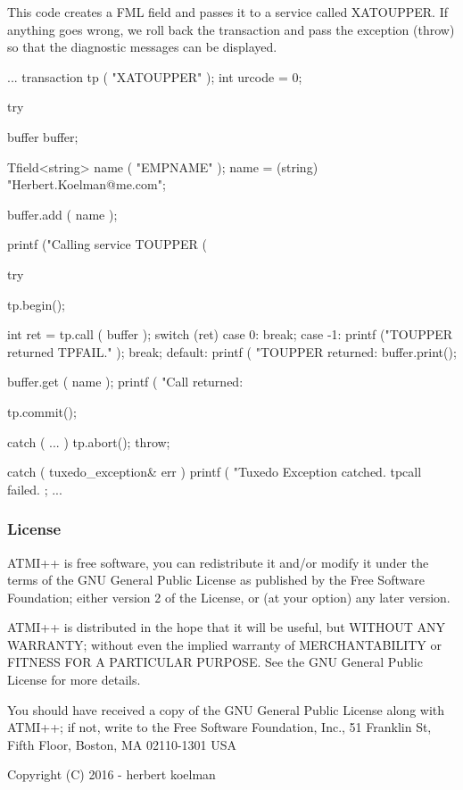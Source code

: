 This code creates a F\+M\+L field and passes it to a service called {\ttfamily X\+A\+T\+O\+U\+P\+P\+E\+R}. If anything goes wrong, we roll back the transaction and pass the exception ({\ttfamily throw}) so that the diagnostic messages can be displayed. \begin{DoxyVerb}    ...
    transaction tp ( "XATOUPPER" );
    int urcode = 0;

    try {

      buffer buffer;

      Tfield<string> name ( "EMPNAME" );
      name = (string) "Herbert.Koelman@me.com";

      buffer.add ( name );

      printf ("Calling service TOUPPER (%

      try {

        tp.begin();

        int ret = tp.call ( buffer );
        switch (ret) {
          case 0:
            break;
          case -1:
            printf ("TOUPPER returned TPFAIL.\n" );
            break;
          default:
            printf ( "TOUPPER returned: %
            buffer.print();
        }

        buffer.get ( name );
        printf ( "Call returned: %

        tp.commit();
      } catch ( ... ){
        tp.abort();
        throw;
      }

    } catch ( tuxedo_exception& err ) {
      printf ( "Tuxedo Exception catched. tpcall failed. %
    };
    ...
\end{DoxyVerb}


\subsubsection*{License}





A\+T\+M\+I++ is free software, you can redistribute it and/or modify it under the terms of the G\+N\+U General Public License as published by the Free Software Foundation; either version 2 of the License, or (at your option) any later version.

A\+T\+M\+I++ is distributed in the hope that it will be useful, but W\+I\+T\+H\+O\+U\+T A\+N\+Y W\+A\+R\+R\+A\+N\+T\+Y; without even the implied warranty of M\+E\+R\+C\+H\+A\+N\+T\+A\+B\+I\+L\+I\+T\+Y or F\+I\+T\+N\+E\+S\+S F\+O\+R A P\+A\+R\+T\+I\+C\+U\+L\+A\+R P\+U\+R\+P\+O\+S\+E. See the G\+N\+U General Public License for more details.

You should have received a copy of the G\+N\+U General Public License along with A\+T\+M\+I++; if not, write to the Free Software Foundation, Inc., 51 Franklin St, Fifth Floor, Boston, M\+A 02110-\/1301 U\+S\+A 

 Copyright (C) 2016 -\/ herbert koelman 